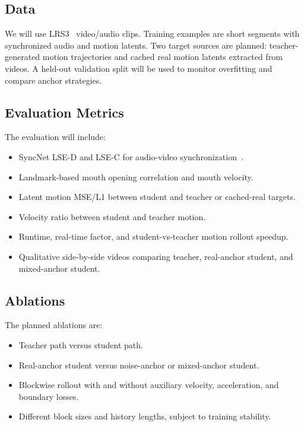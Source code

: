 \documentclass{article}
\begin{document}
\subsection{Data}

We will use LRS3~\cite{lrs3} video/audio clips. Training examples are short segments with synchronized audio and motion latents. Two target sources are planned: teacher-generated motion trajectories and cached real motion latents extracted from videos. A held-out validation split will be used to monitor overfitting and compare anchor strategies.

\subsection{Evaluation Metrics}

The evaluation will include:
\begin{itemize}
    \item SyncNet LSE-D and LSE-C for audio-video synchronization~\cite{syncnet,wav2lip}.
    \item Landmark-based mouth opening correlation and mouth velocity.
    \item Latent motion MSE/L1 between student and teacher or cached-real targets.
    \item Velocity ratio between student and teacher motion.
    \item Runtime, real-time factor, and student-vs-teacher motion rollout speedup.
    \item Qualitative side-by-side videos comparing teacher, real-anchor student, and mixed-anchor student.
\end{itemize}

\subsection{Ablations}

The planned ablations are:
\begin{itemize}
    \item Teacher path versus student path.
    \item Real-anchor student versus noise-anchor or mixed-anchor student.
    \item Blockwise rollout with and without auxiliary velocity, acceleration, and boundary losses.
    \item Different block sizes and history lengths, subject to training stability.
\end{itemize}
\end{document}
